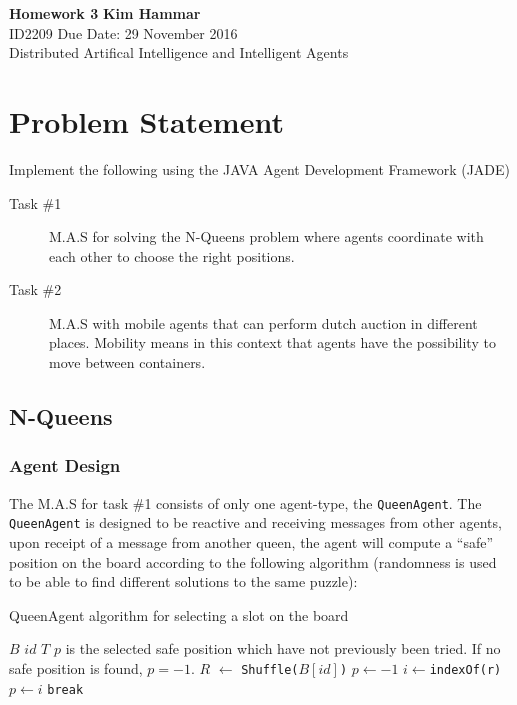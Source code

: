 \documentclass[a4paper, 11pt]{article}
\begin{document}
\noindent
\large\textbf{Homework 3} \hfill \textbf{Kim Hammar} \\
\normalsize ID2209 \hfill Due Date: 29 November 2016 \\
Distributed Artifical Intelligence and Intelligent Agents \hfill \\

\section*{Problem Statement}
Implement the following using the JAVA Agent Development Framework (JADE) \citep{jade}
\begin{description}
\item[Task \#1] M.A.S for solving the N-Queens problem where agents coordinate with each other to choose the right positions.
\item[Task \#2] M.A.S with mobile agents that can perform dutch auction in different places. Mobility means in this context that agents have the possibility to move between containers.
\end{description}

\subsection*{N-Queens}
\subsubsection*{Agent Design}
The M.A.S for task \#1 consists of only one agent-type, the \texttt{QueenAgent}. The \texttt{QueenAgent} is designed to be reactive and receiving messages from other agents, upon receipt of a message from another queen, the agent will compute a ``safe'' position on the board according to the following algorithm (randomness is used to be able to find different solutions to the same puzzle):
\begin{algorithm}[H]
\caption{QueenAgent algorithm for selecting a slot on the board}
\label{queen_algo}
\begin{algorithmic}[H]
\Require 
\State $B$ 
\State $id$ 
\State $T$ 
\Ensure 
\State $p$ is the selected safe position which have not previously been tried. If no safe position is found, $p = -1$.
\State
\State $R$  $\leftarrow$ \texttt{Shuffle($B[id]$)} 
\State $p \leftarrow -1$
\State $i \leftarrow $\texttt{indexOf(r)}
\State $p \leftarrow i$
\State \texttt{break}
\EndIf
\EndFor
\EndProcedure
\end{algorithmic}
\end{algorithm}
\end{document}
